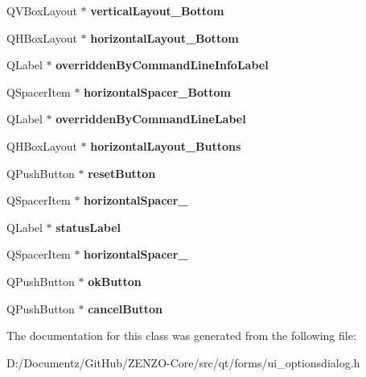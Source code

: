 \begin{DoxyCompactItemize}
Q\+V\+Box\+Layout $\ast$ {\bfseries vertical\+Layout\+\_\+\+Bottom}
\item 
\mbox{\label{class_ui___options_dialog_a448c14c5c30ef5c5cd3bf7d95f34dee9}} 
Q\+H\+Box\+Layout $\ast$ {\bfseries horizontal\+Layout\+\_\+\+Bottom}
\item 
\mbox{\label{class_ui___options_dialog_a2c9ae00b5520a24f8469bb96330b976a}} 
Q\+Label $\ast$ {\bfseries overridden\+By\+Command\+Line\+Info\+Label}
\item 
\mbox{\label{class_ui___options_dialog_a1051bad00fbda2b63e90bf4c409d2280}} 
Q\+Spacer\+Item $\ast$ {\bfseries horizontal\+Spacer\+\_\+\+Bottom}
\item 
\mbox{\label{class_ui___options_dialog_a22e8364e8b8eac89ddf4e0840ed4cd58}} 
Q\+Label $\ast$ {\bfseries overridden\+By\+Command\+Line\+Label}
\item 
\mbox{\label{class_ui___options_dialog_aaadced265806c8d9000adafe02e81202}} 
Q\+H\+Box\+Layout $\ast$ {\bfseries horizontal\+Layout\+\_\+\+Buttons}
\item 
\mbox{\label{class_ui___options_dialog_a42660b94fc9d644bf9f441121cc7bf2b}} 
Q\+Push\+Button $\ast$ {\bfseries reset\+Button}
\item 
\mbox{\label{class_ui___options_dialog_a9e79c7da528c0fdb1d4e7656fd1821f3}} 
Q\+Spacer\+Item $\ast$ {\bfseries horizontal\+Spacer\+\_}
\item 
\mbox{\label{class_ui___options_dialog_afa4159cf035de9f8cf124597a6c78463}} 
Q\+Label $\ast$ {\bfseries status\+Label}
\item 
\mbox{\label{class_ui___options_dialog_a73b82029b93ee8dfb0bdbdeb117b3d41}} 
Q\+Spacer\+Item $\ast$ {\bfseries horizontal\+Spacer\+\_}
\item 
\mbox{\label{class_ui___options_dialog_a6fb48404ef9d00012a0558fc9d79afc4}} 
Q\+Push\+Button $\ast$ {\bfseries ok\+Button}
\item 
\mbox{\label{class_ui___options_dialog_a3dd05ac22a79a4b180f84c373d2fa1f8}} 
Q\+Push\+Button $\ast$ {\bfseries cancel\+Button}
\end{DoxyCompactItemize}


The documentation for this class was generated from the following file\+:\begin{DoxyCompactItemize}
\item 
D\+:/\+Documentz/\+Git\+Hub/\+Z\+E\+N\+Z\+O-\/\+Core/src/qt/forms/ui\+\_\+optionsdialog.\+h\end{DoxyCompactItemize}
